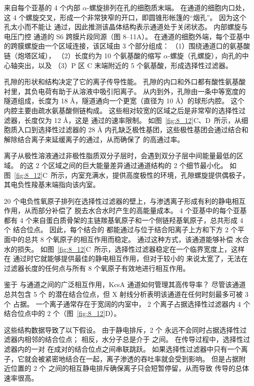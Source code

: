 来自每个亚基的 4 个内部 $\alpha$-螺旋排列在孔的细胞质末端。
在通道的细胞内口处，这 4 个螺旋交叉，形成一个非常狭窄的开口，即圆锥形帐篷的“烟孔”。
因为这个孔太小而不能让  通过，因此推测该晶体结构表示通道处于关闭状态。
内部螺旋与电压门控  通道的 S6 跨膜片段同源（图 8–11A）。
在通道的细胞外端，每个亚基中的跨膜螺旋由一个区域连接，该区域由 3 个部分组成：
（1）围绕通道口的氨基酸链（炮塔区域），
（2）长度约为 10 个氨基酸的缩写 $\alpha$-螺旋（孔螺旋），向孔的中心轴突出，以及
（3）P 区 C 末端附近的 5 个氨基酸，形成选择性过滤器。


孔隙的形状和结构决定了它的离子传导性能。
孔隙的内口和外口都有酸性氨基酸衬里，其负电荷有助于从溶液中吸引阳离子。
从内到外，孔隙由一条中等宽度的隧道组成，长度为 18 Å，隧道通向一个更宽（直径为 10 Å）的球形内腔。
这个内腔主要由疏水氨基酸侧链构成。
这些相对较宽的区域之后是非常窄的选择性过滤器，长度仅为 12 Å，这是  通过的速率限制。
如图~\ref{fig:8_12}C、D~所示，从细胞质入口到选择性过滤器的 28 Å 内孔缺乏极性基团，这些极性基团会通过结合和解除结合离子来延缓离子的通过，从而确保了  的高通过率。


离子从极性溶液通过非极性脂质双分子层时，会遇到双分子层中间能量最低的区域。
 的这 2 个区域之间的巨大能量差异通过通道结构的 2 个细节最小化。
如图~\ref{fig:8_12}C~所示，内室充满水，提供高度极性的环境，孔隙螺旋提供偶极子，其电负性羧基末端指向该内室。


20 个电负性氧原子排列在选择性过滤器的壁上，与渗透离子形成有利的静电相互作用，从而部分补偿了  脱去水合水时产生的高能量成本。
4 个亚基中的每个亚基都有 4 个来自蛋白质骨架的主链羰基氧原子和一个侧链羟基氧原子，总共形成 4 个  结合位点。
因此，每个结合的  都能通过与位于结合阳离子上方和下方 2 个平面中的总共 8 个氧原子的相互作用而稳定。
通过这种方式，该通道能够补偿  水合水的损失。
如图~\ref{fig:8_12}C~所示，选择性过滤器稳定在一个临界宽度上，这样在  通过时它就能够提供最佳的静电相互作用，但对于较小的  来说太宽了，无法在过滤器长度的任何点与所有 8 个氧原子有效地进行相互作用。


鉴于  与通道之间的广泛相互作用，KcsA 通道如何管理其高传导率？
尽管该通道总共包含 5 个  的潜在结合位点，但 X 射线分析表明该通道在任何时刻最多可被 3 个  占据。
一个离子通常存在于宽阔的内室中， 2 个离子占据选择性过滤器内 4 个结合位点中的 2 个（图~\ref{fig:8_12}D）。


这些结构数据导致了以下假设。
由于静电排斥，2 个  永远不会同时占据选择性过滤器内相邻的结合位点；
相反，水分子总是介于  之间。
在传导过程中，选择性过滤器内的一对  在成对的结合位点之间串联跳跃。
如果选择性过滤器中只有一个离子，它就会被紧密地结合在一起，离子渗透的吞吐率就会受到影响。
但是占据附近位置的 2 个  之间的相互静电排斥确保离子只会短暂停留，从而导致  传导的总体速率很高。



